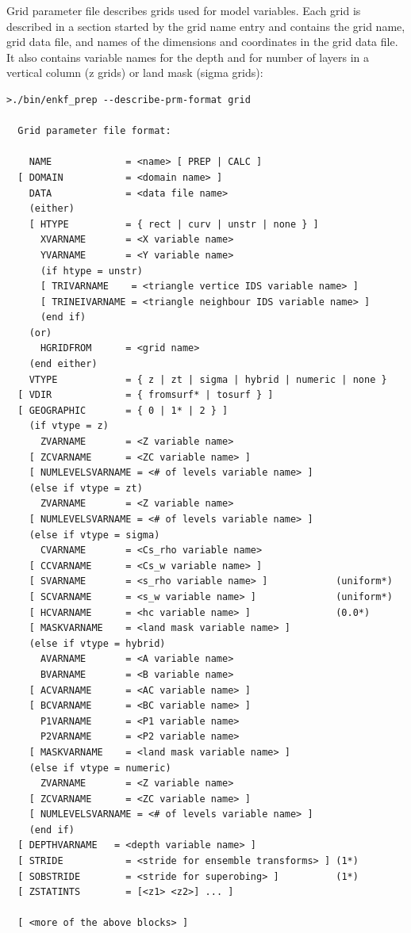 \documentclass[11pt]{report}
\begin{document}
Grid parameter file describes grids used for model variables.
Each grid is described in a section started by the grid name entry and contains the grid name, grid data file, and names of the dimensions and coordinates in the grid data file.
It also contains variable names for the depth and for number of layers in a vertical column (z grids) or land mask (sigma grids):
\begin{Verbatim}[frame=single,fontsize=\footnotesize]
>./bin/enkf_prep --describe-prm-format grid

  Grid parameter file format:

    NAME             = <name> [ PREP | CALC ]
  [ DOMAIN           = <domain name> ]
    DATA             = <data file name>
    (either)
    [ HTYPE          = { rect | curv | unstr | none } ]
      XVARNAME       = <X variable name>
      YVARNAME       = <Y variable name>
      (if htype = unstr)
      [ TRIVARNAME    = <triangle vertice IDS variable name> ]
      [ TRINEIVARNAME = <triangle neighbour IDS variable name> ]
      (end if)
    (or)
      HGRIDFROM      = <grid name>
    (end either)
    VTYPE            = { z | zt | sigma | hybrid | numeric | none }
  [ VDIR             = { fromsurf* | tosurf } ]
  [ GEOGRAPHIC       = { 0 | 1* | 2 } ]
    (if vtype = z)
      ZVARNAME       = <Z variable name>
    [ ZCVARNAME      = <ZC variable name> ]
    [ NUMLEVELSVARNAME = <# of levels variable name> ]
    (else if vtype = zt)
      ZVARNAME       = <Z variable name>
    [ NUMLEVELSVARNAME = <# of levels variable name> ]
    (else if vtype = sigma)
      CVARNAME       = <Cs_rho variable name>
    [ CCVARNAME      = <Cs_w variable name> ]
    [ SVARNAME       = <s_rho variable name> ]            (uniform*)
    [ SCVARNAME      = <s_w variable name> ]              (uniform*)
    [ HCVARNAME      = <hc variable name> ]               (0.0*)
    [ MASKVARNAME    = <land mask variable name> ]
    (else if vtype = hybrid)
      AVARNAME       = <A variable name>
      BVARNAME       = <B variable name>
    [ ACVARNAME      = <AC variable name> ]
    [ BCVARNAME      = <BC variable name> ]
      P1VARNAME      = <P1 variable name>
      P2VARNAME      = <P2 variable name>
    [ MASKVARNAME    = <land mask variable name> ]
    (else if vtype = numeric)
      ZVARNAME       = <Z variable name>
    [ ZCVARNAME      = <ZC variable name> ]
    [ NUMLEVELSVARNAME = <# of levels variable name> ]
    (end if)
  [ DEPTHVARNAME   = <depth variable name> ]
  [ STRIDE           = <stride for ensemble transforms> ] (1*)
  [ SOBSTRIDE        = <stride for superobing> ]          (1*)
  [ ZSTATINTS        = [<z1> <z2>] ... ]

  [ <more of the above blocks> ]
\end{Verbatim}
\end{document}
